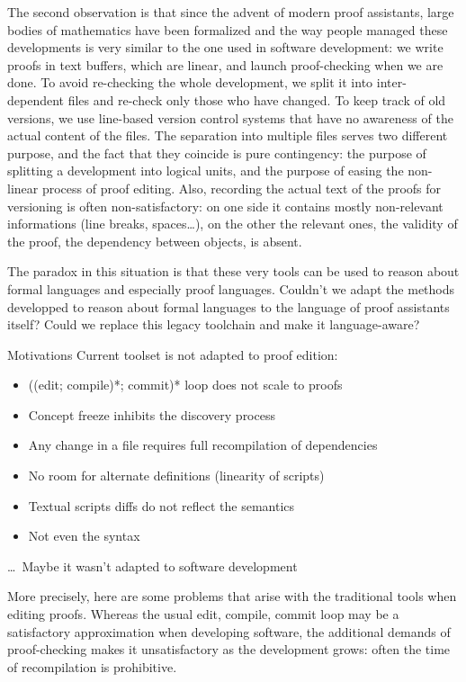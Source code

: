 \documentclass[ignorenonframetext,red]{beamer}
\begin{document}
The second observation is that since the advent of modern proof
assistants, large bodies of mathematics have been formalized and the
way people managed these developments is very similar to the one used
in software development: we write proofs in text buffers, which are
linear, and launch proof-checking when we are done. To avoid
re-checking the whole development, we split it into inter-dependent
files and re-check only those who have changed. To keep track of old
versions, we use line-based version control systems that have no
awareness of the actual content of the files. The separation into
multiple files serves two different purpose, and the fact that they
coincide is pure contingency: the purpose of splitting a development
into logical units, and the purpose of easing the non-linear process
of proof editing. Also, recording the actual text of the proofs for
versioning is often non-satisfactory: on one side it contains mostly
non-relevant informations (line breaks, spaces\ldots), on the other
the relevant ones, the validity of the proof, the dependency between
objects, is absent.

The paradox in this situation is that these very tools can be used to
reason about formal languages and especially proof languages. Couldn't
we adapt the methods developped to reason about formal languages to
the language of proof assistants itself? Could we replace this legacy
toolchain and make it language-aware?

\begin{frame}{Motivations}
  Current toolset is not adapted to proof edition:
  \begin{itemize}
  \item ((edit; compile)*; commit)* loop does not scale to proofs
  \item Concept freeze inhibits the discovery process
  \item Any change in a file requires full recompilation of
    dependencies
  \item No room for alternate definitions (linearity of scripts)
  \item Textual scripts \textsf{diff}s do not reflect the semantics
  \item Not even the syntax
  \end{itemize}
  \vspace{2em}
  {\tiny \ldots\ Maybe it wasn't adapted to software development}
\end{frame}

More precisely, here are some problems that arise with the traditional
tools when editing proofs. Whereas the usual edit, compile, commit
loop may be a satisfactory approximation when developing software, the
additional demands of proof-checking makes it unsatisfactory as the
development grows: often the time of recompilation is prohibitive. 
\end{document}
